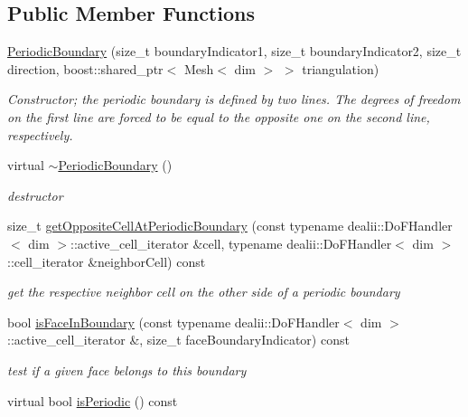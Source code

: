 \subsection*{Public Member Functions}
\begin{DoxyCompactItemize}
\item 
\hyperlink{classnatrium_1_1PeriodicBoundary_ad105994a331755f654822813875771d8}{PeriodicBoundary} (size\_\-t boundaryIndicator1, size\_\-t boundaryIndicator2, size\_\-t direction, boost::shared\_\-ptr$<$ Mesh$<$ dim $>$ $>$ triangulation)
\begin{DoxyCompactList}\small\item\em Constructor; the periodic boundary is defined by two lines. The degrees of freedom on the first line are forced to be equal to the opposite one on the second line, respectively. \item\end{DoxyCompactList}\item 
\hypertarget{classnatrium_1_1PeriodicBoundary_ae71c1a8ea1f1f9e29be8ab6496125a5c}{
virtual \hyperlink{classnatrium_1_1PeriodicBoundary_ae71c1a8ea1f1f9e29be8ab6496125a5c}{$\sim$PeriodicBoundary} ()}
\label{classnatrium_1_1PeriodicBoundary_ae71c1a8ea1f1f9e29be8ab6496125a5c}

\begin{DoxyCompactList}\small\item\em destructor \item\end{DoxyCompactList}\item 
size\_\-t \hyperlink{classnatrium_1_1PeriodicBoundary_aaa861135e070feb4b3dd4408c487cd14}{getOppositeCellAtPeriodicBoundary} (const typename dealii::DoFHandler$<$ dim $>$::active\_\-cell\_\-iterator \&cell, typename dealii::DoFHandler$<$ dim $>$::cell\_\-iterator \&neighborCell) const 
\begin{DoxyCompactList}\small\item\em get the respective neighbor cell on the other side of a periodic boundary \item\end{DoxyCompactList}\item 
bool \hyperlink{classnatrium_1_1PeriodicBoundary_af43c1306653cc8a9d5aea68edcfca370}{isFaceInBoundary} (const typename dealii::DoFHandler$<$ dim $>$::active\_\-cell\_\-iterator \&, size\_\-t faceBoundaryIndicator) const 
\begin{DoxyCompactList}\small\item\em test if a given face belongs to this boundary \item\end{DoxyCompactList}\item 
\hypertarget{classnatrium_1_1PeriodicBoundary_a38c5e966e4b2a1ee185a5634fc379393}{
virtual bool \hyperlink{classnatrium_1_1PeriodicBoundary_a38c5e966e4b2a1ee185a5634fc379393}{isPeriodic} () const }
\label{classnatrium_1_1PeriodicBoundary_a38c5e966e4b2a1ee185a5634fc379393}


\end{DoxyCompactItemize}
